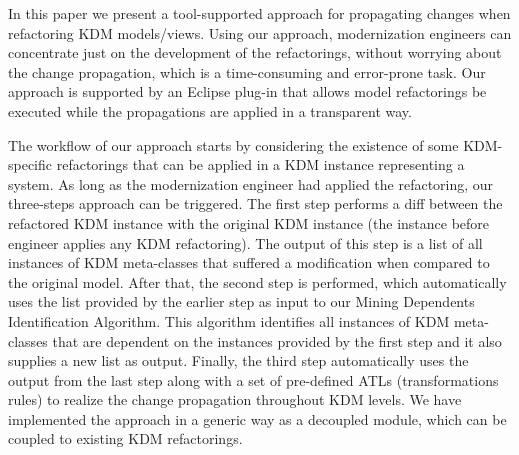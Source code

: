 In this paper we present a tool-supported approach for propagating changes when refactoring KDM models/views. Using our approach, modernization engineers can concentrate just on the development of the refactorings, without worrying about the change propagation, which is a time-consuming and error-prone task. Our approach is supported by an Eclipse plug-in that allows model refactorings be executed while the propagations are applied in a transparent way.


The workflow of our approach starts by considering the existence of some KDM-specific refactorings that can be applied in a KDM instance representing a system. As long as the modernization engineer had applied the refactoring, our three-steps approach can be triggered. The first step performs a diff between the refactored KDM instance with the original KDM instance (the instance before engineer applies any KDM refactoring). The output of this step is a list of all instances of KDM meta-classes that suffered a modification when compared to the original model. After that, the second step is performed, which automatically uses the list provided by the earlier step as input to our Mining Dependents Identification Algorithm. This algorithm identifies all instances of KDM meta-classes that are dependent on the instances provided by the first step and it also supplies a new list as output.
%
%
%
Finally, the third step automatically uses the output from the last step along with a set of pre-defined ATLs (transformations rules) to realize the change propagation throughout KDM levels. We have implemented the approach in a generic way as a decoupled module, which can be coupled to existing KDM refactorings. 




